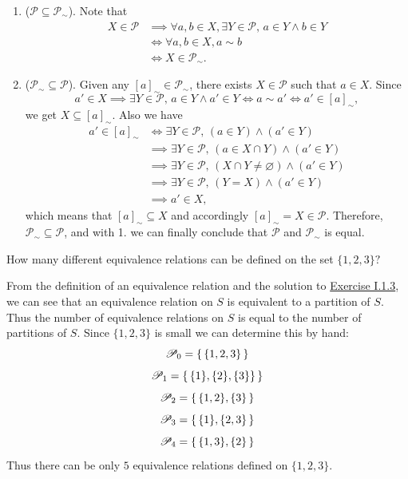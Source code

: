 \begin{solution}
	\begin{enumerate}
		\item ($\mathscr{P}\subseteq\mathscr{P}_{\sim}$). Note that
		\begin{align*}
			X\in\mathscr{P}&\implies\forall a,b\in X,\exists Y\in\mathscr{P},\,a\in Y \land b\in Y\\
			&\iff\forall a,b\in X,a\sim b\\			
			&\iff X\in\mathscr{P}_{\sim}.
		\end{align*}
		\item ($\mathscr{P}_{\sim}\subseteq\mathscr{P}$). Given any $\left[a\right]_{\sim}\in\mathscr{P}_{\sim}$, there exists $X\in\mathscr{P}$ such that $a\in X$. Since 
		\[
		a'\in X\implies\exists Y\in\mathscr{P},\,a\in Y \land a'\in Y\iff a\sim a'\iff a'\in \left[a\right]_{\sim},
		\]
		we get $X\subseteq \left[a\right]_{\sim}$. Also we have 
		\begin{align*}
		a'\in \left[a\right]_{\sim}&\iff \exists Y\in\mathscr{P},\,(a\in Y) \land (a'\in Y)\\
		&\implies \exists Y\in\mathscr{P},\,(a\in X\cap Y) \land(a'\in Y)\\
		&\implies \exists Y\in\mathscr{P},\, (X\cap Y\ne\varnothing)\land (a'\in Y)\\
		&\implies \exists Y\in\mathscr{P},\, (Y=X)\land (a'\in Y)\\
		&\implies 	a'\in X,
		\end{align*}
		which means that $\left[a\right]_{\sim}\subseteq X$ and accordingly $\left[a\right]_{\sim}=X\in\mathscr{P}$. Therefore,
		$\mathscr{P}_{\sim}\subseteq\mathscr{P}$, and with 1. we can finally conclude that $\mathscr{P}$ and $\mathscr{P}_{\sim}$ is equal.
	\end{enumerate}
\end{solution}


\begin{problem}[1.4]
	How many different equivalence relations can be defined on the set $\{1,2,3\}?$
\end{problem}

\begin{solution}
	From the definition of an equivalence relation and the solution to \hyperlink{Exercise I.1.3}{Exercise I.1.3}, we can see that an equivalence relation on $S$ is equivalent to
	a partition of $S$. Thus the number of equivalence relations on $S$ is equal to
	the number of partitions of $S$. Since $\{1,2,3\}$ is small we can determine
	this by hand:
	\[ \mathscr{P}_0 = \left\{\,\{1,2,3\}\,\right\} \]
	\[ \mathscr{P}_1 = \left\{\,\{1\},\{2\},\{3\}\}\,\right\} \]
	\[ \mathscr{P}_2 = \left\{\,\{1,2\},\{3\}\,\right\} \]
	\[ \mathscr{P}_3 = \left\{\,\{1\},\{2,3\}\,\right\} \]
	\[ \mathscr{P}_4 = \left\{\,\{1,3\},\{2\}\,\right\} \]
	Thus there can be only $5$ equivalence relations defined on $\{1,2,3\}$.
\end{solution}



